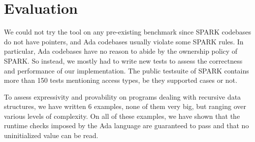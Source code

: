 \documentclass[runningheads]{llncs}
\begin{document}
\section{Evaluation}
We could not try the tool on any pre-existing benchmark since SPARK codebases do not have pointers, and Ada codebases usually violate some SPARK rules. In particular, Ada codebases have no reason to abide by the ownership policy of SPARK. So instead, we mostly had to write new tests to assess the correctness and performance of our implementation.
The public testsuite of SPARK contains more than 150 tests mentioning access types, be they supported cases or not.

To assess expressivity and provability on programs dealing with recursive data structures, we have written 6 examples, none of them very big, but ranging over various levels of complexity.
%
%
%
On all of these examples, we have shown that the runtime checks imposed by the Ada language are guaranteed to pass and that no uninitialized value can be read.
\end{document}
